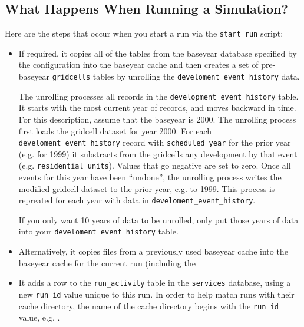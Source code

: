 \subsection{What Happens When Running a Simulation?}
\label{sec:run-manager-tasks}
Here are the steps that occur when you start a run via the \verb|start_run|
script:

\begin{itemize}
  
\item {} If 
required, it copies all of the tables from the baseyear database specified by 
the configuration into the baseyear cache \baseyearcacheindex and then creates a
set of pre-baseyear \verb|gridcells| tables by unrolling the
\verb|develoment_event_history| data.

The unrolling processes all records in the \verb|development_event_history| 
table.  It starts with the most current year of records, and moves backward in 
time.  For this description, assume that the baseyear is 2000.  The unrolling 
process first loads the gridcell dataset for year 2000.  For each 
\verb|develoment_event_history| record with \verb|scheduled_year| for the prior 
year (e.g. for 1999) it substracts from the gridcells any development by that 
event (e.g. \verb|residential_units|).  Values that go negative are set to 
zero.  Once all events for this year have been ``undone'', the unrolling 
process writes the modified gridcell dataset to the prior year, e.g. to 1999. 
This process is repreated for each year with data in 
\verb|develoment_event_history|.

If you only want 10 years of data to be unrolled, only put those years of data
into your \verb|develoment_event_history| table.

\item Alternatively, it copies files from a previously used baseyear cache into
the baseyear cache for the current run (including the

\item It adds a row to the \verb|run_activity| table in the \verb|services|
database, using a new \verb|run_id| value unique to this run. In order to help
match runs with their cache directory, the name of the cache directory begins
with the \verb|run_id| value, e.g. .


\end{itemize}
